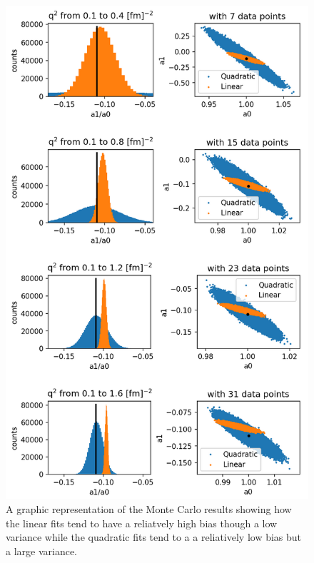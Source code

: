 \documentclass[10pt,aps,prc,twocolumn]{revtex4-1}
\begin{document}
\begin{figure}[htbp]
\includegraphics[width=\columnwidth]{Figure/zresult.png}
\caption{A graphic representation of the Monte Carlo results showing how the linear fits tend to have a reliatvely
high bias though a low variance while the quadratic fits tend to a a reliatively low bias but a large variance.}
\end{figure}
\end{document}
